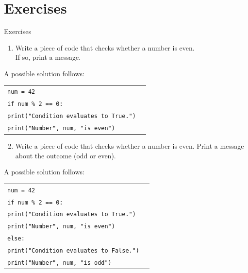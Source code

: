 \documentclass[t,handout,9pt]{beamer}
\begin{document}
\section{Exercises}
\begin{frame}{Exercises}
\vfill
\begin{enumerate}
	\item Write a piece of code that checks whether a number is even.\\If so, print a message.
\end{enumerate}
\vfill
A possible solution follows:
\begin{table}[]
	\begin{tabular}{ll}
	\texttt{num = 42} & \\
	\texttt{if num \% 2 == 0:} & \\
	\texttt{\qquad print("Condition evaluates to True.")} & \\
	\texttt{\qquad print("Number", num, "is even")} & \\
	\end{tabular}
	\end{table}
\vfill
\end{frame}
%
\begin{frame}
\vfill
\begin{enumerate}
\setcounter{enumi}{1}
	\item Write a piece of code that checks whether a number is even. Print a message about the outcome (odd or even).
\end{enumerate}
\vfill
A possible solution follows:
\begin{table}[]
	\begin{tabular}{ll}
	\texttt{num = 42} & \\
	\texttt{if num \% 2 == 0:} & \\
	\texttt{\qquad print("Condition evaluates to True.")} & \\
	\texttt{\qquad print("Number", num, "is even")} & \\
	\texttt{else:} & \\
	\texttt{\qquad print("Condition evaluates to False.")} & \\
	\texttt{\qquad print("Number", num, "is odd")} & \\
	\end{tabular}
	\end{table}
\vfill
\end{frame}
%
\end{document}
